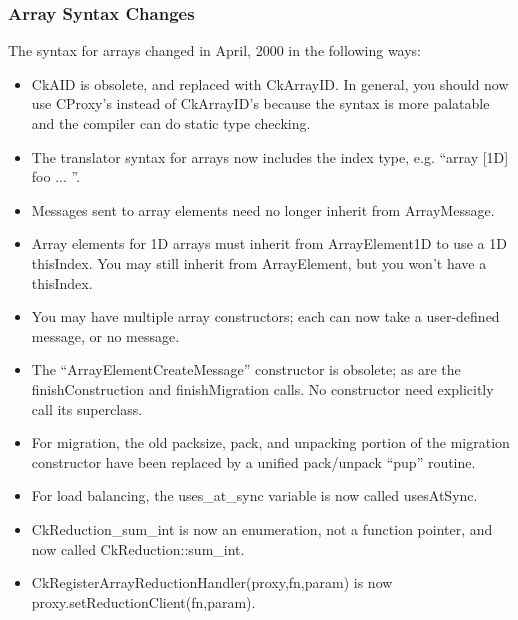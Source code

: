 \subsubsection{Array Syntax Changes}
The syntax for arrays changed in April, 2000 in the following ways:

\begin{itemize}

\item CkAID is obsolete, and replaced with CkArrayID.  In general,
you should now use CProxy's instead of CkArrayID's because the syntax
is more palatable and the compiler can do static type checking.

\item The translator syntax for arrays now includes the index type,
e.g. ``array [1D] foo { ... }''.

\item Messages sent to array elements need no longer inherit from 
ArrayMessage.

\item Array elements for 1D arrays must inherit from ArrayElement1D
to use a 1D thisIndex.  You may still inherit from ArrayElement, but you
won't have a thisIndex.

\item You may have multiple array constructors; each can now take a user-defined message, or no message.  

\item The ``ArrayElementCreateMessage'' constructor is obsolete;
as are the finishConstruction and finishMigration calls. No constructor
need explicitly call its superclass.

\item For migration, the old packsize, pack, and unpacking portion of
the migration constructor have been replaced by a unified pack/unpack 
``pup'' routine.

\item For load balancing, the uses\_at\_sync variable is now called usesAtSync.

\item CkReduction\_sum\_int is now an enumeration, not a function pointer, and
now called CkReduction::sum\_int.

\item CkRegisterArrayReductionHandler(proxy,fn,param)
is now proxy.setReductionClient(fn,param).
\end{itemize}



